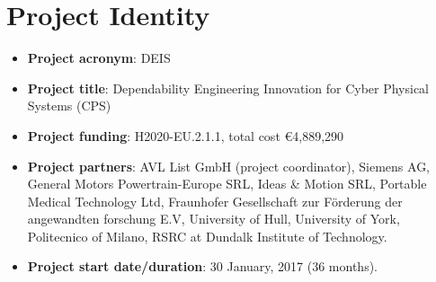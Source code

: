 \section{Project Identity}
\begin{itemize}
	\item \textbf{Project acronym}: DEIS
	\item \textbf{Project title}: Dependability Engineering Innovation for Cyber Physical Systems (CPS)
	\item \textbf{Project funding}: H2020-EU.2.1.1, total cost \euro 4,889,290
	\item \textbf{Project partners}: AVL List GmbH (project coordinator), Siemens AG, General Motors Powertrain-Europe SRL, Ideas \& Motion SRL, Portable Medical Technology Ltd, Fraunhofer Gesellschaft zur F{\"o}rderung der angewandten forschung E.V, University of Hull, University of York, Politecnico of Milano, RSRC at Dundalk Institute of Technology.
	\item \textbf{Project start date/duration}: 30 January, 2017 (36 months).
\end{itemize}